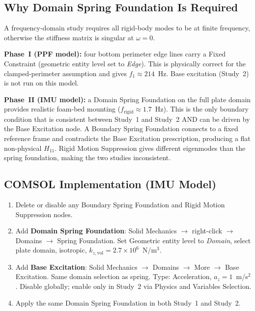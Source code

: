 \documentclass[12pt,a4paper]{article}
\begin{document}
\subsection{Why Domain Spring Foundation Is Required}
\label{sec:bc}

A frequency-domain study requires all rigid-body modes to be at finite frequency,
otherwise the stiffness matrix is singular at $\omega = 0$.

\textbf{Phase~I (PPF model):} four bottom perimeter edge lines carry a Fixed
Constraint (geometric entity level set to \emph{Edge}).  This is physically
correct for the clamped-perimeter assumption and gives $f_1 \approx 214$~Hz.
Base excitation (Study~2) is not run on this model.

\textbf{Phase~II (IMU model):} a Domain Spring Foundation on the full plate domain
provides realistic foam-bed mounting ($f_\text{rigid} \approx 1.7$~Hz).  This is
the only boundary condition that is consistent between Study~1 and Study~2 AND can
be driven by the Base Excitation node.  A Boundary Spring Foundation connects to a
fixed reference frame and contradicts the Base Excitation prescription, producing a
flat non-physical $H_{11}$.  Rigid Motion Suppression gives different eigenmodes
than the spring foundation, making the two studies inconsistent.

\subsection{COMSOL Implementation (IMU Model)}

\begin{enumerate}
  \item Delete or disable any Boundary Spring Foundation and Rigid Motion
        Suppression nodes.
  \item Add \textbf{Domain Spring Foundation}: Solid Mechanics $\to$
        right-click $\to$ Domains $\to$ Spring Foundation.
        Set Geometric entity level to \emph{Domain}, select plate domain,
        isotropic, $k_{z,\text{vol}} = 2.7 \times 10^6$~N/m$^3$.
  \item Add \textbf{Base Excitation}: Solid Mechanics $\to$ Domains $\to$
        More $\to$ Base Excitation.  Same domain selection as spring.
        Type: Acceleration, $a_z = 1$~m/s$^2$.
        Disable globally; enable only in Study~2 via Physics and Variables
        Selection.
  \item Apply the same Domain Spring Foundation in both Study~1 and Study~2.
\end{enumerate}
\end{document}

